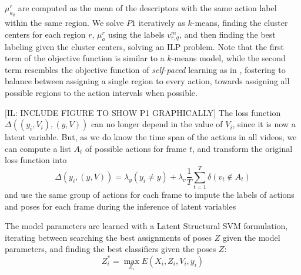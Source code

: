 $\mu_{a_q}^r$ are computed as the mean of the descriptors with the same action 
label within the same region. We solve $P1$ iteratively as $k$-means,  finding 
the cluster centers for each region $r$, $\mu_{a}^r$ using the labels 
$v_{r,q}^m$, and then finding the best labeling given the cluster centers, 
solving an ILP problem. Note that the first term of the objective function is 
similar to a $k$-means model, while the second term resembles the objective 
function of \emph{self-paced} learning as in \cite{Kumar2010}, fostering to 
balance between assigning a single region to every action, towards assigning 
all 
possible regions to the action intervals when possible.  

[IL: INCLUDE  FIGURE TO SHOW P1 GRAPHICALLY]
The loss function $\Delta((y_i,V_i),(y,V))$ can no longer depend in the value 
of $V_i$, since it is now a latent variable. But, as we do know the time span 
of the actions in all videos, we can compute a list $A_t$ of possible actions 
for frame $t$, and transform the original loss function into
\begin{equation}
\Delta(y_i,(y,V)) = \lambda_y(y_i \ne y) + \lambda_v\frac{1}{T}\sum_{t=1}^T 
\delta(v_t \notin A_t)
\end{equation}
and use the same group of actions for each frame to impute the labels of 
actions 
and poses for each frame during the inference of latent variables

The model parameters are learned with a Latent Structural SVM formulation, 
iterating between searching the best assignments of poses $Z$ given the model 
parameters, and finding the best classifiers given the poses $Z$:
\begin{equation}
 Z_i^* = \max_{Z_i} E(X_i, Z_i, V_i, y_i)
\end{equation}